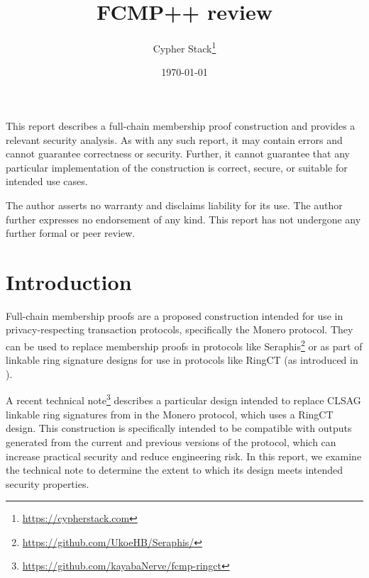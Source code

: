 \documentclass{article}
\title{FCMP++ review}
\author{Cypher Stack\thanks{\url{https://cypherstack.com}}}
\date{\today}
\theoremstyle{definition}
\begin{document}
\maketitle

This report describes a full-chain membership proof construction and provides a relevant security analysis.
As with any such report, it may contain errors and cannot guarantee correctness or security.
Further, it cannot guarantee that any particular implementation of the construction is correct, secure, or suitable for intended use cases.

The author asserts no warranty and disclaims liability for its use.
The author further expresses no endorsement of any kind.
This report has not undergone any further formal or peer review.

\tableofcontents


\section{Introduction}

Full-chain membership proofs are a proposed construction intended for use in privacy-respecting transaction protocols, specifically the Monero protocol.
They can be used to replace membership proofs in protocols like Seraphis\footnote{\url{https://github.com/UkoeHB/Seraphis/}} or as part of linkable ring signature designs for use in protocols like RingCT (as introduced in \cite{ringct}).

A recent technical note\footnote{\url{https://github.com/kayabaNerve/fcmp-ringct}} describes a particular design intended to replace CLSAG linkable ring signatures from \cite{clsag} in the Monero protocol, which uses a RingCT design.
This construction is specifically intended to be compatible with outputs generated from the current and previous versions of the protocol, which can increase practical security and reduce engineering risk.
In this report, we examine the technical note to determine the extent to which its design meets intended security properties.
\end{document}
